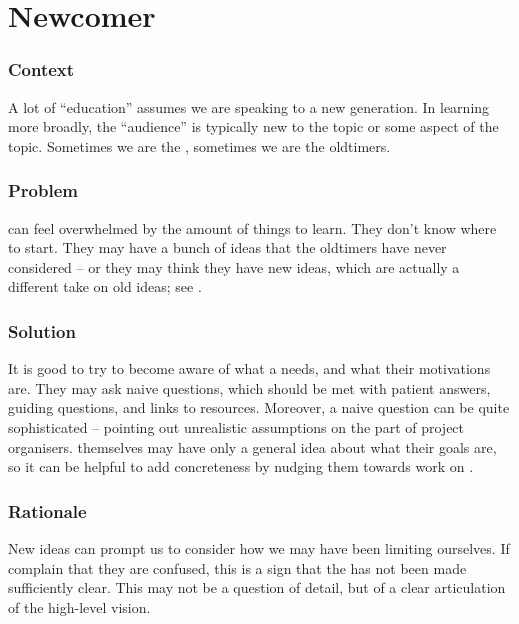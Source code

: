 

\section{Newcomer}\label{sec:Newcomer}

\subsubsection*{Context}
A lot of ``education'' assumes we are speaking to a new generation. 
In learning more broadly, the ``audience'' is typically new to the topic or some aspect of the topic.
Sometimes we are the , sometimes we are the oldtimers.

\subsubsection*{Problem}  can feel overwhelmed by the amount of things to learn.  They
don't know where to start.  They may have a bunch of ideas that the
oldtimers have never considered -- or they may think they have new
ideas, which are actually a different take on old ideas; see
.

\subsubsection*{Solution} It is good to try to become aware of what a
 needs, and what their motivations are.  They may ask naive questions, which
should be met with patient answers, guiding questions, and links to resources.
Moreover, a naive question can be quite sophisticated -- pointing out unrealistic
assumptions on the part of project organisers.   themselves
may have only a general idea about what their goals are, so it can be helpful to add
concreteness by nudging them towards work on .

\subsubsection*{Rationale} 
New ideas can prompt us to consider how we may have been limiting ourselves.
If  complain that they are confused, this is a sign that
the  has not been made sufficiently clear.  This may not
be a question of detail, but of a clear articulation of the high-level vision.

